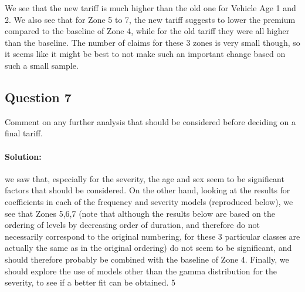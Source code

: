 \documentclass[
]{article}
\begin{document}
We see that the new tariff is much higher than the old one for Vehicle
Age 1 and 2. We also see that for Zone 5 to 7, the new tariff suggests
to lower the premium compared to the baseline of Zone 4, while for the
old tariff they were all higher than the baseline. The number of claims
for these 3 zones is very small though, so it seems like it might be
best to not make such an important change based on such a small sample.

\hypertarget{question-7}{%
\subsection{Question 7}\label{question-7}}

Comment on any further analysis that should be considered before
deciding on a final tariff.

\hypertarget{solution-6}{%
\paragraph{Solution:}\label{solution-6}}

we saw that, especially for the severity, the age and sex seem to be
significant factors that should be considered. On the other hand,
looking at the results for coefficients in each of the frequency and
severity models (reproduced below), we see that Zones 5,6,7 (note that
although the results below are based on the ordering of levels by
decreasing order of duration, and therefore do not necessarily
correspond to the original numbering, for these 3 particular classes are
actually the same as in the original ordering) do not seem to be
significant, and should therefore probably be combined with the baseline
of Zone 4. Finally, we should explore the use of models other than the
gamma distribution for the severity, to see if a better fit can be
obtained. 5
\end{document}
